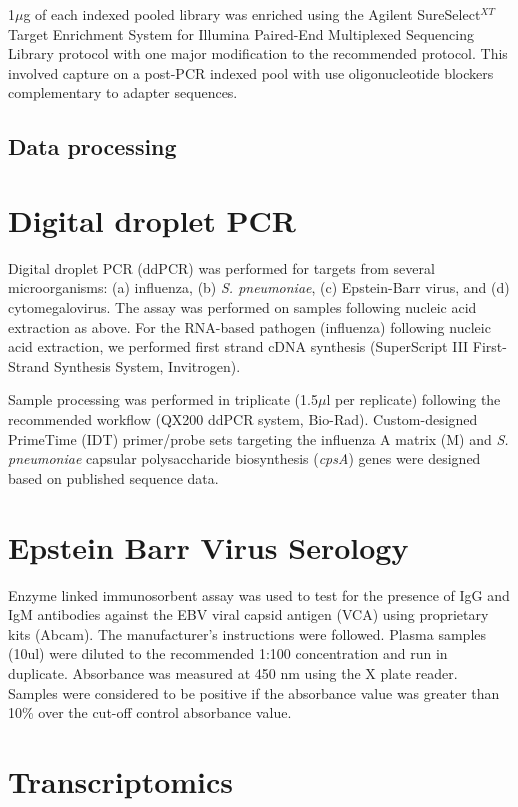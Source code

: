 1$\mu$g of each indexed pooled library was enriched using the Agilent SureSelect$^{XT}$ Target Enrichment System for Illumina Paired-End Multiplexed Sequencing Library protocol with one major modification to the recommended protocol. This involved capture on a post-PCR indexed pool with use oligonucleotide blockers complementary to adapter sequences.

\subsection{Data processing}

\section{Digital droplet PCR}
Digital droplet PCR (ddPCR) was performed for targets from several microorganisms: (a) influenza, (b) \textit{S. pneumoniae}, (c) Epstein-Barr virus, and (d) cytomegalovirus. The assay was performed on samples following nucleic acid extraction as above. For the RNA-based pathogen (influenza) following nucleic acid extraction, we performed first strand cDNA synthesis (SuperScript III First-Strand Synthesis System, Invitrogen). 

Sample processing was performed in triplicate (1.5$\mu$l per replicate) following the recommended workflow (QX200 ddPCR system, Bio-Rad). Custom-designed PrimeTime (IDT) primer/probe sets targeting the influenza A matrix (M) and \textit{S. pneumoniae} capsular polysaccharide biosynthesis (\textit{cpsA}) genes were designed based on published sequence data.

\section{Epstein Barr Virus Serology}
Enzyme linked immunosorbent assay was used to test for the presence of IgG and IgM antibodies against the EBV viral capsid antigen (VCA) using proprietary kits (Abcam). The manufacturer's instructions were followed. Plasma samples (10ul) were diluted to the recommended 1:100 concentration and run in duplicate. Absorbance was measured at 450 nm using the X plate reader. Samples were considered to be positive if the absorbance value was greater than 10\% over the cut-off control absorbance value. 

\section{Transcriptomics}
